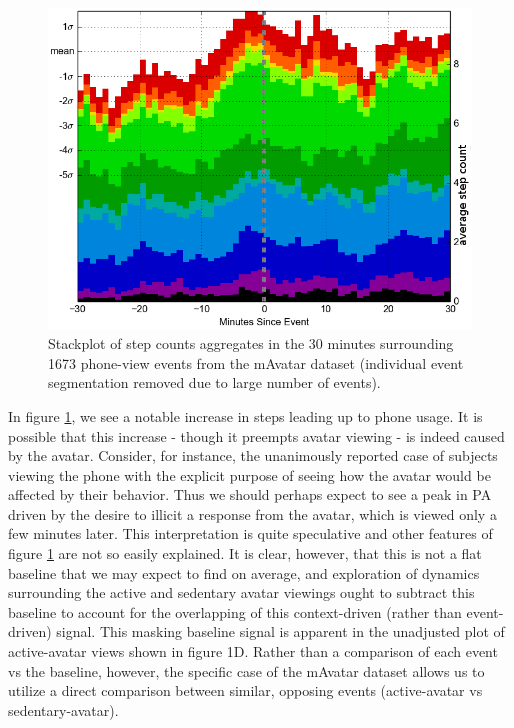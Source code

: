 \begin{figure}
\centering
\includegraphics[width=0.9\columnwidth]{./img/mAvatarViews_1673_wOverlap_noLines.png}
\caption{Stackplot of step counts aggregates in the 30 minutes surrounding 1673 phone-view events from the mAvatar dataset (individual event segmentation removed due to large number of events).}
\label{fig:mAvatarPhoneContext}
\end{figure}

In figure \ref{fig:mAvatarPhoneContext}, we see a notable increase in steps leading up to phone usage.
It is possible that this increase - though it preempts avatar viewing - is indeed caused by the avatar.
Consider, for instance, the unanimously reported case of subjects viewing the phone with the explicit purpose of seeing how the avatar would be affected by their behavior.
Thus we should perhaps expect to see a peak in PA driven by the desire to illicit a response from the avatar, which is viewed only a few minutes later.
This interpretation is quite speculative and other features of figure \ref{fig:mAvatarPhoneContext} are not so easily explained.
It is clear, however, that this is not a flat baseline that we may expect to find on average, and exploration of dynamics surrounding the active and sedentary avatar viewings ought to subtract this baseline to account for the overlapping of this context-driven (rather than event-driven) signal.
This masking baseline signal is apparent in the unadjusted plot of active-avatar views shown in figure 1D. 
Rather than a comparison of each event vs the baseline, however, the specific case of the mAvatar dataset allows us to utilize a direct comparison between similar, opposing events (active-avatar vs sedentary-avatar).

